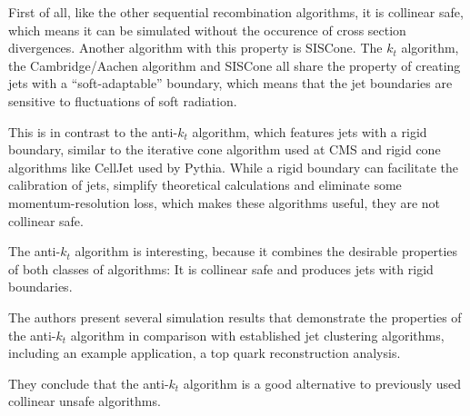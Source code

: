 First of all, like the other sequential recombination algorithms, it is collinear safe, which means it can be simulated without the occurence of cross section divergences.
Another algorithm with this property is SISCone.
The $k_t$ algorithm, the Cambridge/Aachen algorithm and SISCone all share the property of creating jets with a \enquote{soft-adaptable} boundary, which means that the jet boundaries are sensitive to fluctuations of soft radiation.

This is in contrast to the anti-$k_t$ algorithm, which features jets with a rigid boundary, similar to the iterative cone algorithm used at CMS and rigid cone algorithms like CellJet used by Pythia.
While a rigid boundary can facilitate the calibration of jets, simplify theoretical calculations and eliminate some momentum-resolution loss, which makes these algorithms useful, they are not collinear safe.

The anti-$k_t$ algorithm is interesting, because it combines the desirable properties of both classes of algorithms: It is collinear safe and produces jets with rigid boundaries.

The authors present several simulation results that demonstrate the properties of the anti-$k_t$ algorithm in comparison with established jet clustering algorithms, including an example application, a top quark reconstruction analysis.

They conclude that the anti-$k_t$ algorithm is a good alternative to previously used collinear unsafe algorithms.

\vspace{1em}

\nocite{*}
\printbibliography


